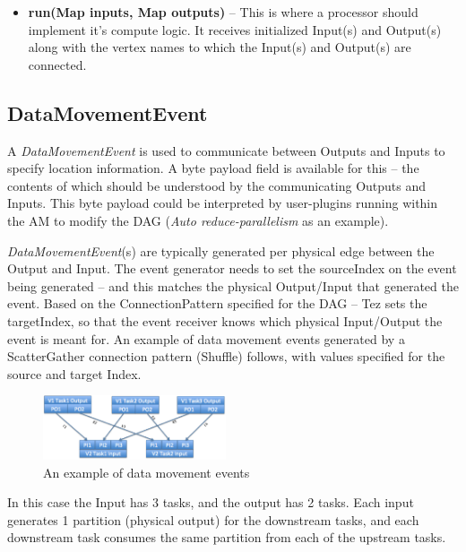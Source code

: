 \documentclass[twocolumn]{article}
\newcommand{\bi}{\begin{itemize}}
\newcommand{\ei}{\end{itemize}}
\newcommand{\ii}{\item}
\begin{document}
\bi
\ii \textbf{run(Map inputs, Map outputs)} -- This is where a processor should
implement it's compute logic. It receives initialized Input(s) and
Output(s) along with the vertex names to which the Input(s) and
Output(s) are connected.
\ei
\subsection{DataMovementEvent}

A \textit{DataMovementEvent} is used to communicate between Outputs and Inputs to
specify location information. A byte payload field is available for this
-- the contents of which should be understood by the communicating
Outputs and Inputs. This byte payload could be interpreted by
user-plugins running within the AM to modify the DAG (\textit{Auto
reduce-parallelism} as an example).

\textit{DataMovementEvent}(s) are typically generated per physical edge between
the Output and Input. The event generator needs to set the sourceIndex
on the event being generated -- and this matches the physical
Output/Input that generated the event. Based on the ConnectionPattern
specified for the DAG -- Tez sets the targetIndex, so that the event
receiver knows which physical Input/Output the event is meant for. An
example of data movement events generated by a ScatterGather connection
pattern (Shuffle) follows, with values specified for the source and
target Index.

\begin{figure}[htb]
        \centering
        \includegraphics[width=0.48\textwidth]{tez02}
        \caption{An example of data movement events}
        \label{fig14}
\end{figure}

In this case the Input has 3 tasks, and the output has 2 tasks. Each
input generates 1 partition (physical output) for the downstream tasks,
and each downstream task consumes the same partition from each of the
upstream tasks.
\end{document}

